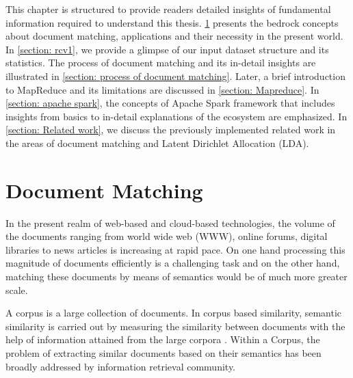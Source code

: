 \label{background}
This chapter is structured to provide readers detailed insights of fundamental information required to understand this thesis. \ref{section: document matching} presents the bedrock concepts about document matching, applications and their necessity in the present world. In \ref{section: rcv1}, we provide a glimpse of our input dataset structure and its statistics. The process of document matching and its in-detail insights are illustrated in \ref{section: process of document matching}. Later, a brief introduction to  MapReduce and its limitations are discussed in \ref{section: Mapreduce}. In \ref{section: apache spark}, the concepts of Apache Spark framework that includes insights from basics to in-detail explanations of the ecosystem are emphasized. In \ref{section: Related work}, we discuss the previously implemented related work in the areas of document matching and Latent Dirichlet Allocation (LDA).

\section{Document Matching}
\label{section: document matching}
In the present realm of web-based and cloud-based technologies, the volume of the documents ranging from world wide web (WWW), online forums, digital libraries to news articles is increasing at rapid pace. On one hand processing this magnitude of documents efficiently is a challenging task and on the other hand, matching these documents by means of semantics would be of much more greater scale. 


\par  A corpus is a large collection of documents. In corpus based similarity, semantic similarity is carried out by measuring the similarity between documents with the help of information attained from the large corpora \cite{gomaa2013survey}. Within a Corpus, the problem of extracting similar documents based on their semantics has been broadly addressed by information retrieval community.

